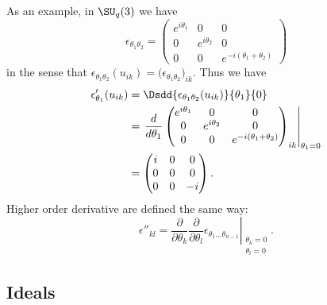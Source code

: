 As an example, in $\SU_q(3)$ we have
\begin{equation}
	\epsilon_{\theta_1\theta_2}=
	\begin{pmatrix}
		e^{i\theta_1} & 0             & 0                         \\
		0             & e^{i\theta_2} & 0                         \\
		0             & 0             & e^{-i(\theta_1+\theta_2)}
	\end{pmatrix}
\end{equation}
in the sense that $\epsilon_{\theta_1\theta_2}(u_{ik})=\big( \epsilon_{\theta_1\theta_2} \big)_{ik}$. Thus we have
\begin{equation}
	\begin{aligned}[]
		\epsilon'_{\theta_1}(u_{ik}) & =\Dsdd{ \epsilon_{\theta_1\theta_2}(u_{ik}) }{\theta_1}{0} \\
		                             & =\left.\frac{ d }{ d\theta_1 }
		\begin{pmatrix}
			e^{i\theta_1} & 0             & 0                         \\
			0             & e^{i\theta_2} & 0                         \\
			0             & 0             & e^{-i(\theta_1+\theta_2)}
		\end{pmatrix}_{ik}\right|_{\theta_1=0}                                 \\
		                             & =\begin{pmatrix}
			                                i & 0 & 0  \\
			                                0 & 0 & 0  \\
			                                0 & 0 & -i
		                                \end{pmatrix}.
	\end{aligned}
\end{equation}
Higher order derivative are defined the same way:
\begin{equation}
	\epsilon''_{kl}=\left.\frac{ \partial  }{ \partial \theta_k }\frac{ \partial  }{ \partial \theta_l }\epsilon_{\theta_1\ldots\theta_{n-1}}\right|_{\substack{\theta_k=0\\\theta_l=0}}.
\end{equation}

\subsection{Ideals}

